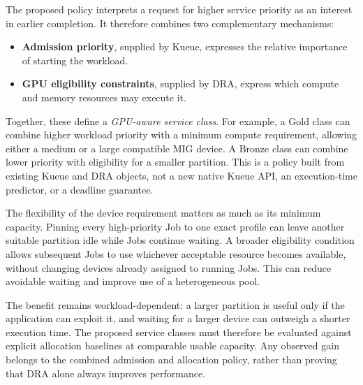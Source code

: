 The proposed policy interprets a request for higher service priority as an interest in earlier completion. It therefore combines two complementary mechanisms:

\begin{itemize}
    \item \textbf{Admission priority}, supplied by Kueue, expresses the relative importance of starting the workload.
    \item \textbf{GPU eligibility constraints}, supplied by DRA, express which compute and memory resources may execute it.
\end{itemize}

Together, these define a \emph{GPU-aware service class}. For example, a Gold class can combine higher workload priority with a minimum compute requirement, allowing either a medium or a large compatible MIG device. A Bronze class can combine lower priority with eligibility for a smaller partition. This is a policy built from existing Kueue and DRA objects, not a new native Kueue API, an execution-time predictor, or a deadline guarantee.

The flexibility of the device requirement matters as much as its minimum capacity. Pinning every high-priority Job to one exact profile can leave another suitable partition idle while Jobs continue waiting. A broader eligibility condition allows subsequent Jobs to use whichever acceptable resource becomes available, without changing devices already assigned to running Jobs. This can reduce avoidable waiting and improve use of a heterogeneous pool.

The benefit remains workload-dependent: a larger partition is useful only if the application can exploit it, and waiting for a larger device can outweigh a shorter execution time. The proposed service classes must therefore be evaluated against explicit allocation baselines at comparable usable capacity. Any observed gain belongs to the combined admission and allocation policy, rather than proving that DRA alone always improves performance.

